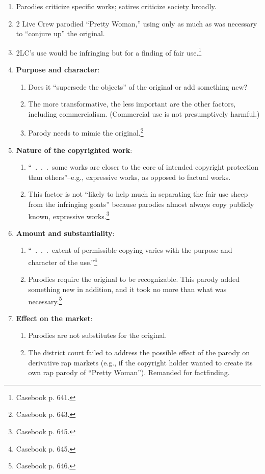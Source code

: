 \begin{enumerate}
    \item Parodies criticize specific works; satires criticize society 
    broadly.
    \item 2 Live Crew parodied ``Pretty Woman,'' using only as much as was 
    necessary to ``conjure up'' the original.
    \item 2LC's use would be infringing but for a finding of fair 
    use.\footnote{Casebook p. 641.}
    \item \textbf{Purpose and character}:
    \begin{enumerate}
        \item Does it ``supersede the objects'' of the original or add 
        something new?
        \item The more transformative, the less important are the other 
        factors, including commercialism. (Commercial use is not presumptively 
        harmful.)
        \item Parody needs to mimic the original.\footnote{Casebook p. 643.}
    \end{enumerate}
    \item \textbf{Nature of the copyrighted work}:
    \begin{enumerate}
        \item ``~.~.~.~some works are closer to the core of intended copyright 
        protection than others''--e.g., expressive works, as opposed to 
        factual works.
        \item This factor is not ``likely to help much in separating the fair 
        use sheep from the infringing goats'' because parodies almost always 
        copy publicly known, expressive works.\footnote{Casebook p. 645.}
    \end{enumerate}
    \item \textbf{Amount and substantiality}:
    \begin{enumerate}
        \item ``~.~.~.~extent of permissible copying varies with the purpose 
        and character of the use.''\footnote{Casebook p. 645.}
        \item Parodies require the original to be recognizable. This parody 
        added something new in addition, and it took no more than what was 
        necessary.\footnote{Casebook p. 646.}
    \end{enumerate}
    \item \textbf{Effect on the market}:
    \begin{enumerate}
        \item Parodies are not substitutes for the original.
        \item The district court failed to address the possible effect of the 
        parody on derivative rap markets (e.g., if the copyright holder wanted 
        to create its own rap parody of ``Pretty Woman''). Remanded for 
        factfinding.
    \end{enumerate}
\end{enumerate}

